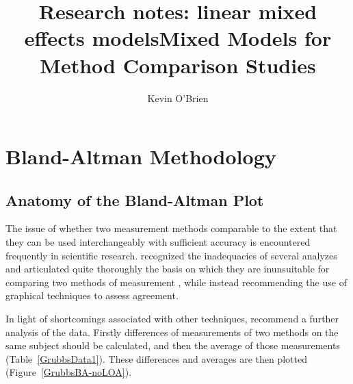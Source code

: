 \documentclass[12pt, a4paper]{report}
\title{Research notes: linear mixed effects models}
\author{ } \date{ }
\theoremstyle{plain}
\theoremstyle{definition}
\theoremstyle{remark}
\begin{document}
	\author{Kevin O'Brien}
	\title{Mixed Models for Method Comparison Studies}
	\tableofcontents
	
	\newpage
	\chapter{Bland-Altman Methodology}
	\section{Anatomy of the Bland-Altman Plot}
	
	The issue of whether two measurement methods comparable to the 	extent that they can be used interchangeably with sufficient accuracy is encountered frequently in scientific research. \citet{BA83}
	 recognized the inadequacies of several analyzes and articulated quite thoroughly the basis on which they are inunsuitable for comparing two methods of measurement \citep*{BA83}, while instead recommending the use of graphical techniques to assess agreement.

In light of shortcomings associated with other techniques, \citet*{BA83} recommend a further analysis of the data. Firstly
differences of measurements of two methods on the same subject should  be calculated, and then the average of those measurements
(Table~\ref{GrubbsData1}). These differences and averages are then plotted (Figure~\ref{GrubbsBA-noLOA}).

		
\end{document}
